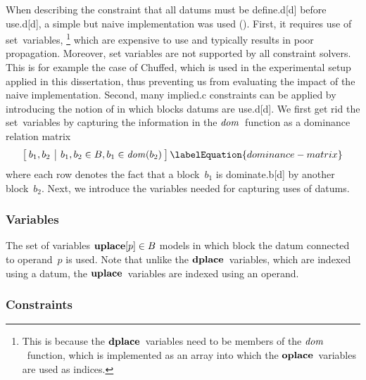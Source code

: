 When describing the \gls{constraint} that all \glspl{datum} must be
\gls{define.d}[d] before \gls{use.d}[d], a simple but naive implementation was
used ().
%
First, it requires use of set~\glspl{variable},\!%
%
\footnote{%
  This is because the $\mVar{dplace}$~\glspl{variable} need to be members of the
  $\operatorname{\textrm{\textit{dom}}}$~\gls{function}, which is implemented as an array into which the
  $\mVar{oplace}$~\glspl{variable} are used as indices.%
}
%
which are expensive to use and typically results in poor \gls{propagation}.
%
Moreover, set \glspl{variable} are not supported by all \glspl{constraint
  solver}.
%
This is for example the case of \gls{Chuffed}, which is used in the experimental
setup applied in this dissertation, thus preventing us from evaluating the
impact of the naive implementation.
%
Second, many \gls{implied.c} \glspl{constraint} can be applied by introducing
the notion of in which \glspl{block} \glspl{datum} are \gls{use.d}[d].
%
We first get rid the set~\glspl{variable} by capturing the information in the
$\operatorname{\textrm{\textit{dom}}}$~\gls{function} as a dominance relation matrix
%
\begin{equation}
  \begin{bmatrix}
    \begin{array}{@{\:}c|c@{\:}}
        b_1, b_2
      & b_1, b_2 \in \mBlockSet, b_1 \in \mDom(b_2)
    \end{array}
  \end{bmatrix}
  \labelEquation{dominance-matrix}
\end{equation}
%
where each row denotes the fact that a \gls{block}~$b_1$ is \gls{dominate.b}[d]
by another \gls{block}~$b_2$.
%
Next, we introduce the \glspl{variable} needed for capturing uses of
\glspl{datum}.


\subsubsection{Variables}

The set of \glspl{variable} \mbox{$\mVar{uplace}[p] \in \mBlockSet$} models in
which \gls{block} the \gls{datum} connected to \gls{operand}~$p$ is used.
%
Note that unlike the $\mVar{dplace}$~\glspl{variable}, which are indexed using a
\gls{datum}, the $\mVar{uplace}$~\glspl{variable} are indexed using an
\gls{operand}.


\subsubsection{Constraints}

